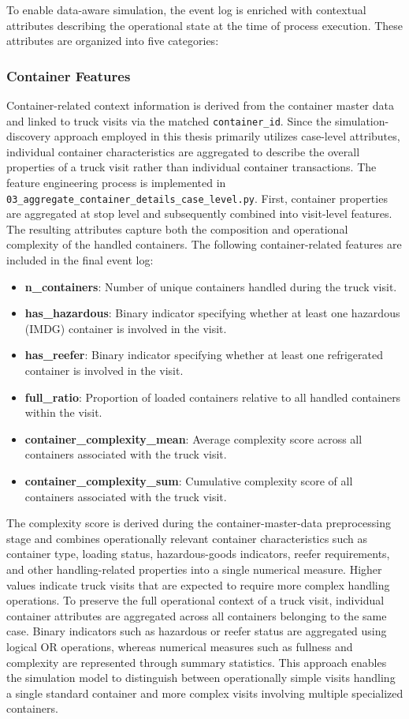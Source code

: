     To enable data-aware simulation, the event log is enriched with contextual attributes describing the operational state at the time of process execution. These attributes are organized into five categories:

        \subsubsection{Container Features} 
        Container-related context information is derived from the container master data and linked to truck visits via the matched \texttt{container\_id}. Since the simulation-discovery approach employed in this thesis primarily utilizes case-level attributes, individual container characteristics are aggregated to describe the overall properties of a truck visit rather than individual container transactions. The feature engineering process is implemented in \texttt{03\_aggregate\_container\_details\_case\_level.py}. First, container properties are aggregated at stop level and subsequently combined into visit-level features. The resulting attributes capture both the composition and operational complexity of the handled containers. The following container-related features are included in the final event log: 
        \begin{itemize} 
        \item \textbf{n\_containers}: Number of unique containers handled during the truck visit. \item \textbf{has\_hazardous}: Binary indicator specifying whether at least one hazardous (IMDG) container is involved in the visit. 
        \item \textbf{has\_reefer}: Binary indicator specifying whether at least one refrigerated container is involved in the visit. 
        \item \textbf{full\_ratio}: Proportion of loaded containers relative to all handled containers within the visit. 
        \item \textbf{container\_complexity\_mean}: Average complexity score across all containers associated with the truck visit. 
        \item \textbf{container\_complexity\_sum}: Cumulative complexity score of all containers associated with the truck visit. 
        \end{itemize} 
        The complexity score is derived during the container-master-data preprocessing stage and combines operationally relevant container characteristics such as container type, loading status, hazardous-goods indicators, reefer requirements, and other handling-related properties into a single numerical measure. Higher values indicate truck visits that are expected to require more complex handling operations. To preserve the full operational context of a truck visit, individual container attributes are aggregated across all containers belonging to the same case. Binary indicators such as hazardous or reefer status are aggregated using logical OR operations, whereas numerical measures such as fullness and complexity are represented through summary statistics. This approach enables the simulation model to distinguish between operationally simple visits handling a single standard container and more complex visits involving multiple specialized containers.
